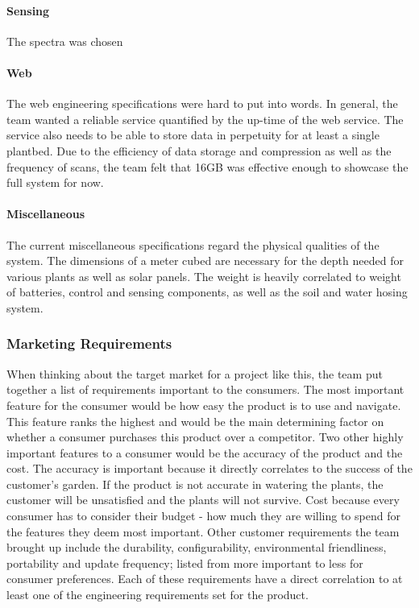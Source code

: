 \paragraph{Sensing}
The spectra was chosen 

\paragraph{Web}
The web engineering specifications were hard to put into words. In general, the team wanted a reliable service quantified by the up-time of the web service. The service also needs to be able to store data in perpetuity for at least a single plantbed. Due to the efficiency of data storage and compression as well as the frequency of scans, the team felt that 16GB was effective enough to showcase the full system for now.

\paragraph{Miscellaneous}
The current miscellaneous specifications regard the physical qualities of the system. The dimensions of a meter cubed are necessary for the depth needed for various plants as well as solar panels. The weight is heavily correlated to weight of batteries, control and sensing components, as well as the soil and water hosing system. 
\subsubsection{Marketing Requirements}
When thinking about the target market for a project like this, the team put together a list of requirements important to the consumers. The most important feature for the consumer would be how easy the product is to use and navigate. This feature ranks the highest and would be the main determining factor on whether a consumer purchases this product over a competitor. Two other highly important features to a consumer would be the accuracy of the product and the cost. The accuracy is important because it directly correlates to the success of the customer's garden. If the product is not accurate in watering the plants, the customer will be unsatisfied and the plants will not survive. Cost because every consumer has to consider their budget - how much they are willing to spend for the features they deem most important. Other customer requirements the team brought up include the durability, configurability, environmental friendliness, portability and update frequency; listed from more important to less for consumer preferences. Each of these requirements have a direct correlation to at least one of the engineering requirements set for the product. \\

